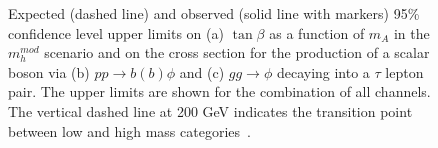 \begin{figure}[!t]
     \begin{center}
     \end{center}
  \caption{ Expected (dashed line) and observed (solid line with markers) 95\% confidence level upper limits on (a) $\tan\beta$ as a function of $m_A$
	in the $m_h^{mod}$ scenario and on the cross section for the production of a scalar boson via (b) $pp \rightarrow b(b)\phi$ and
	(c) $gg \rightarrow\phi$ decaying into a $\tau$ lepton pair. 
	The upper limits are shown  for the  combination of all channels. The vertical dashed line at 200 GeV indicates 
	the transition point between low and high mass categories~\cite{yuppy}.}
\label{fig:mhmod_all}
\end{figure}


